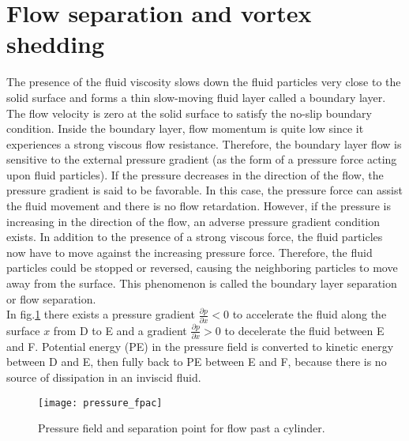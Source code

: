 \section{Flow separation and vortex shedding}
The presence of the fluid viscosity slows down the fluid particles very close to the solid surface and forms a thin slow-moving fluid layer called a boundary layer. The flow velocity is zero at the solid surface to satisfy the no-slip boundary condition. Inside the boundary layer, flow momentum is quite low since it experiences a strong viscous flow resistance. Therefore, the boundary layer flow is sensitive to the external pressure gradient (as the form of a pressure force acting upon fluid particles). If the pressure decreases in the direction of the flow, the pressure gradient is said to be favorable. In this case, the pressure force can assist the fluid movement and there is no flow retardation. However, if the pressure is increasing in the direction of the flow, an adverse pressure gradient condition exists. In addition to the presence of a strong viscous force, the fluid particles now have to move against the increasing pressure force. Therefore, the fluid particles could be stopped or reversed, causing the neighboring particles to move away from the surface. This phenomenon is called the boundary layer separation or flow separation.\\
In fig.\ref{fig:2.7} there exists a pressure gradient $\frac{\partial{p}}{\partial{x}}<0$ to accelerate the fluid along the surface $x$ from D to E and a gradient $\frac{\partial{p}}{\partial{x}}>0$ to decelerate the fluid between E and F. Potential energy (PE) in the pressure field is converted to kinetic energy between D and E, then fully back to PE between E and F, because there is no source of dissipation in an inviscid fluid.\\
 
\begin{figure}[h]
 \centering
 \texttt{[image: pressure\_fpac]}
 \caption{Pressure field and separation point for flow past a cylinder.}
 \label{fig:2.7}
\end{figure}

